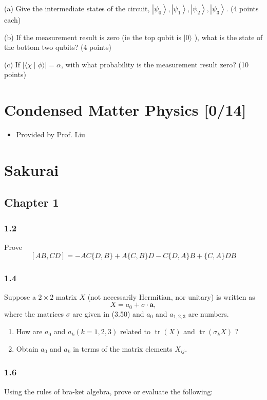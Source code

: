 \documentclass[11pt]{article}
\begin{document}
(a) Give the intermediate states of the circuit,
\(\left|\psi_0\right\rangle,\left|\psi_1\right\rangle,\left|\psi_2\right\rangle,\left|\psi_3\right\rangle\).
(4 points each)

(b) If the measurement result is zero (ie the top qubit is \(|0\rangle\) ), what
is the state of the bottom two qubits? (4 points)

(c) If \(|\langle\chi \mid \phi\rangle|=\alpha\), with what probability is the
measurement result zero? (10 points)
\section{Condensed Matter Physics [0/14]}
\label{sec:org1f86886}
\begin{itemize}
\item Provided by Prof. Liu
\end{itemize}
\section{Sakurai}
\label{sec:orgad49f1a}
\subsection{Chapter 1}
\label{sec:org946d9c7}
\subsubsection{1.2}
\label{sec:org4d61786}
Prove $$
[A B, C D]=-A C\{D, B\}+A\{C, B\} D-C\{D, A\} B+\{C, A\} D B
$$
\subsubsection{1.4}
\label{sec:orge91c6ca}
Suppose a \(2 \times 2\) matrix \(X\) (not necessarily Hermitian, nor unitary) is written as
$$
X=a_0+\sigma \cdot \mathbf{a},
$$
where the matrices \(\sigma\) are given in (3.50) and \(a_0\) and \(a_{1,2,3}\) are numbers.

\begin{enumerate}
\item How are \(a_0\) and \(a_k(k=1,2,3)\) related to \(\operatorname{tr}(X)\) and \(\operatorname{tr}\left(\sigma_k X\right)\) ?

\item Obtain \(a_0\) and \(a_k\) in terms of the matrix elements \(X_{i j}\).
\end{enumerate}
\subsubsection{1.6}
\label{sec:org9e09799}
Using the rules of bra-ket algebra, prove or evaluate the following:
\end{document}
